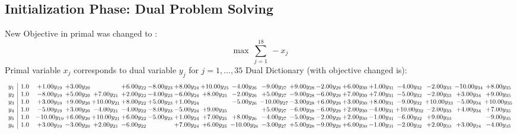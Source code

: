 \documentclass[9pt]{article}
\begin{document}
\subsection{Initialization Phase: Dual Problem Solving}
New Objective in primal was changed to : \[ \max\ \sum_{j=1}^{18}\ - x_j \] 
Primal variable $x_j$ corresponds to dual variable $y_j$ for $j = 1,\ldots,35$
Dual Dictionary (with objective changed is): 
\[\begin{array}{c| c c@{\hskip 2pt} c@{\hskip 2pt} c@{\hskip 2pt} c@{\hskip 2pt} c@{\hskip 2pt} c@{\hskip 2pt} c@{\hskip 2pt} c@{\hskip 2pt} c@{\hskip 2pt} c@{\hskip 2pt} c@{\hskip 2pt} c@{\hskip 2pt} c@{\hskip 2pt} c@{\hskip 2pt} c@{\hskip 2pt} c@{\hskip 2pt} c@{\hskip 2pt} }
 y_{1}   &  1.0 & +  1.00 y_{19} & +  3.00 y_{20} &   & +  6.00 y_{22} & -8.00 y_{23} & +  8.00 y_{24} & + 10.00 y_{25} & -4.00 y_{26} & -9.00 y_{27} & +  9.00 y_{28} & -2.00 y_{29} & +  6.00 y_{30} & +  1.00 y_{31} & -4.00 y_{32} & -2.00 y_{33} & -10.00 y_{34} & +  8.00 y_{35}\\
 y_{2}   &  1.0 & -8.00 y_{19} & +  5.00 y_{20} & +  7.00 y_{21} & +  2.00 y_{22} & -4.00 y_{23} & -6.00 y_{24} & +  8.00 y_{25} & -2.00 y_{26} & +  5.00 y_{27} & -9.00 y_{28} & -6.00 y_{29} & +  7.00 y_{30} & +  7.00 y_{31} & -5.00 y_{32} & -2.00 y_{33} & +  3.00 y_{34} & +  9.00 y_{35}\\
 y_{3}   &  1.0 & +  3.00 y_{19} & +  9.00 y_{20} & + 10.00 y_{21} & +  8.00 y_{22} & +  5.00 y_{23} & +  1.00 y_{24} &   & -5.00 y_{26} & -10.00 y_{27} & -3.00 y_{28} & +  6.00 y_{29} & +  3.00 y_{30} & +  8.00 y_{31} & -9.00 y_{32} & + 10.00 y_{33} & -5.00 y_{34} & + 10.00 y_{35}\\
 y_{4}   &  1.0 & -5.00 y_{19} & +  3.00 y_{20} & -4.00 y_{21} & -4.00 y_{22} & -8.00 y_{23} & -5.00 y_{24} & +  9.00 y_{25} &   & +  5.00 y_{27} & -6.00 y_{28} & -6.00 y_{29} & +  2.00 y_{30} & -4.00 y_{31} & + 10.00 y_{32} & -2.00 y_{33} & +  4.00 y_{34} & +  7.00 y_{35}\\
 y_{5}   &  1.0 & -10.00 y_{19} & +  6.00 y_{20} & + 10.00 y_{21} & +  6.00 y_{22} & -5.00 y_{23} & +  1.00 y_{24} & +  7.00 y_{25} & +  8.00 y_{26} & -4.00 y_{27} & -5.00 y_{28} & -2.00 y_{29} & +  2.00 y_{30} & -1.00 y_{31} & -6.00 y_{32} & +  9.00 y_{33} &   & -9.00 y_{35}\\
 y_{6}   &  1.0 & +  3.00 y_{19} & -3.00 y_{20} & +  2.00 y_{21} & -6.00 y_{22} &   & +  7.00 y_{24} & +  6.00 y_{25} & -10.00 y_{26} & -3.00 y_{27} & +  5.00 y_{28} & -9.00 y_{29} & +  6.00 y_{30} & -1.00 y_{31} & -2.00 y_{32} & +  2.00 y_{33} & +  3.00 y_{34} & -4.00 y_{35}\\

\end{array}\]
\end{document}
